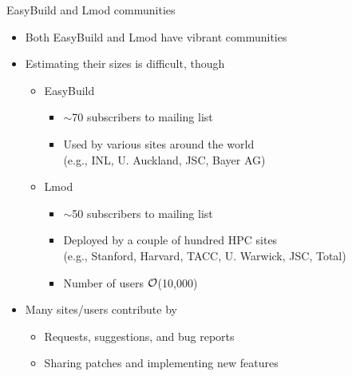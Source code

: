 \documentclass[10pt,xcolor={usenames,dvipsnames}]{beamer}
\begin{document}
\begin{frame}{EasyBuild and Lmod communities}
\begin{itemize}
    \item
        Both EasyBuild and Lmod have vibrant communities
    \item
        Estimating their sizes is difficult, though
        \begin{itemize}
            \item
                EasyBuild
                \begin{itemize}
                    \item
                        $\sim$70 subscribers to mailing list
                    \item
                        Used by various sites around the world\\
                        (e.g., INL, U. Auckland, JSC, Bayer AG)
                \end{itemize}
            \item
                Lmod
                \begin{itemize}
                    \item
                        $\sim$50 subscribers to mailing list
                    \item
                        Deployed by a couple of hundred HPC sites\\
                        (e.g., Stanford, Harvard, TACC, U. Warwick, JSC, Total)
                    \item
                        Number of users $\cal{O}$(10,000)
                \end{itemize}
        \end{itemize}
    \item
        Many sites/users contribute by
        \begin{itemize}
            \item
                Requests, suggestions, and bug reports
            \item
                Sharing patches and implementing new features
        \end{itemize}
\end{itemize}
\end{frame}

\end{document}
